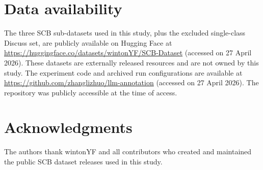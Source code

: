 \documentclass[10pt,letterpaper]{article}
\begin{document}
\section*{Data availability}
The three SCB sub-datasets used in this study, plus the excluded
single-class Discuss set, are publicly available on Hugging Face at
\url{https://huggingface.co/datasets/wintonYF/SCB-Dataset} (accessed on
27 April 2026). These datasets are externally released resources and are
not owned by this study. The experiment code and archived run
configurations are available at
\url{https://github.com/zhanglizhuo/llm-annotation} (accessed on 27 April 2026).
The repository was publicly accessible at the time of access.

\section*{Acknowledgments}
The authors thank wintonYF and all contributors who created and maintained
the public SCB dataset releases used in this study.
\end{document}

